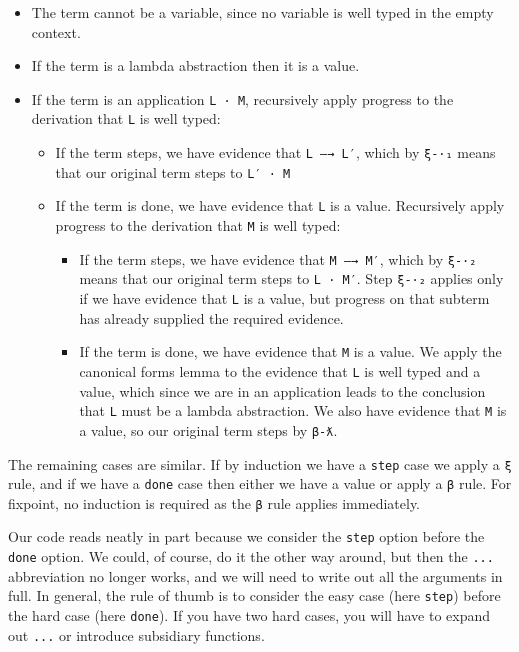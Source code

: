\begin{itemize}
\item
  The term cannot be a variable, since no variable is well typed in the
  empty context.
\item
  If the term is a lambda abstraction then it is a value.
\item
  If the term is an application \texttt{L\ ·\ M}, recursively apply
  progress to the derivation that \texttt{L} is well typed:

  \begin{itemize}
  \item
    If the term steps, we have evidence that \texttt{L\ —→\ L′}, which
    by \texttt{ξ-·₁} means that our original term steps to
    \texttt{L′\ ·\ M}
  \item
    If the term is done, we have evidence that \texttt{L} is a value.
    Recursively apply progress to the derivation that \texttt{M} is well
    typed:

    \begin{itemize}
    \item
      If the term steps, we have evidence that \texttt{M\ —→\ M′}, which
      by \texttt{ξ-·₂} means that our original term steps to
      \texttt{L\ ·\ M′}. Step \texttt{ξ-·₂} applies only if we have
      evidence that \texttt{L} is a value, but progress on that subterm
      has already supplied the required evidence.
    \item
      If the term is done, we have evidence that \texttt{M} is a value.
      We apply the canonical forms lemma to the evidence that \texttt{L}
      is well typed and a value, which since we are in an application
      leads to the conclusion that \texttt{L} must be a lambda
      abstraction. We also have evidence that \texttt{M} is a value, so
      our original term steps by \texttt{β-ƛ}.
    \end{itemize}
  \end{itemize}
\end{itemize}

The remaining cases are similar. If by induction we have a \texttt{step}
case we apply a \texttt{ξ} rule, and if we have a \texttt{done} case
then either we have a value or apply a \texttt{β} rule. For fixpoint, no
induction is required as the \texttt{β} rule applies immediately.

Our code reads neatly in part because we consider the \texttt{step}
option before the \texttt{done} option. We could, of course, do it the
other way around, but then the \texttt{...} abbreviation no longer
works, and we will need to write out all the arguments in full. In
general, the rule of thumb is to consider the easy case (here
\texttt{step}) before the hard case (here \texttt{done}). If you have
two hard cases, you will have to expand out \texttt{...} or introduce
subsidiary functions.

